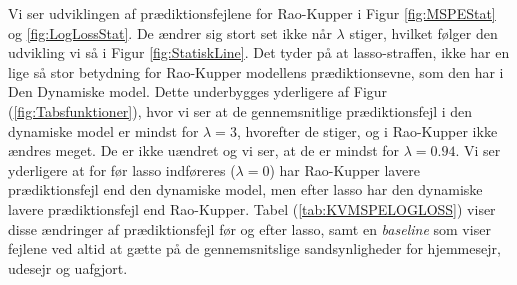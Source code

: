 \documentclass[11pt,a4paper]{article}
\begin{document}
 Vi ser udviklingen af prædiktionsfejlene for Rao-Kupper i Figur \ref{fig:MSPEStat} og \ref{fig:LogLossStat}. De ændrer sig stort set ikke når $\lambda$ stiger, hvilket følger den udvikling vi så i Figur \ref{fig:StatiskLine}. Det tyder på at lasso-straffen, ikke har en lige så stor betydning for Rao-Kupper modellens prædiktionsevne, som den har i Den Dynamiske model. Dette underbygges yderligere af Figur (\ref{fig:Tabsfunktioner}), hvor vi ser at de gennemsnitlige prædiktionsfejl i den dynamiske model er mindst for $\lambda = 3$, hvorefter de stiger, og i Rao-Kupper ikke ændres meget. De er ikke uændret og vi ser, at de er mindst for $\lambda = 0.94$. Vi ser yderligere at for før lasso indføreres ($\lambda = 0$) har Rao-Kupper lavere prædiktionsfejl end den dynamiske model, men efter lasso har den dynamiske lavere prædiktionsfejl end Rao-Kupper. Tabel (\ref{tab:KVMSPELOGLOSS}) viser disse ændringer af prædiktionsfejl før og efter lasso, samt en \textit{baseline} som viser fejlene ved altid at gætte på de gennemsnitslige sandsynligheder for hjemmesejr, udesejr og uafgjort. \\
\end{document}
